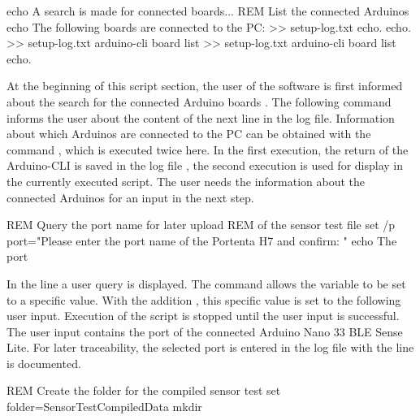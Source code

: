 \medskip


\begin{PowerShell}
echo A search is made for connected boards...
REM List the connected Arduinos
echo The following boards are connected to the PC: >> setup-log.txt
echo.
echo. >> setup-log.txt
arduino-cli board list >> setup-log.txt
arduino-cli board list
echo.
\end{PowerShell}

\medskip


At the beginning of this script section, the user of the software is first informed about the search for the connected Arduino boards . The following command  informs the user about the content of the next line in the log file. Information about which Arduinos are connected to the PC can be obtained with the command , which is executed twice here. In the first execution, the return of the Arduino-CLI is saved in the log file , the second execution is used for display in the currently executed script. The user needs the information about the connected Arduinos for an input in the next step.

\medskip


{\small
\begin{PowerShell}
REM Query the port name for later upload 
REM of the sensor test file
set /p port="Please enter the port name of the Portenta H7 and confirm: "
echo The port %
\end{PowerShell}
}

\medskip


In the line  a user query is displayed. The command  allows the variable  to be set to a specific value. With the addition , this specific value is set to the following user input. Execution of the script is stopped until the user input is successful. The user input contains the port of the connected Arduino Nano 33 BLE Sense Lite. For later traceability, the selected port is entered in the log file with the line  is documented. 

\medskip


\begin{PowerShell}
REM Create the folder for the compiled sensor test
set folder=SensorTestCompiledData
mkdir %
\end{PowerShell}

